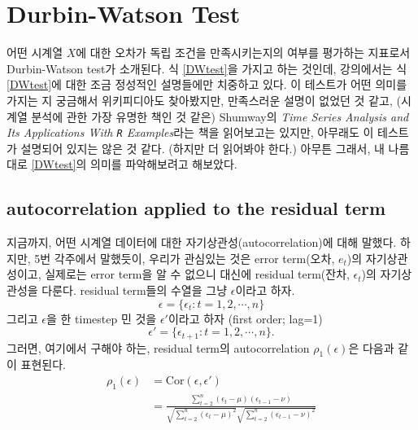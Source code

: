 \documentclass{article}
\begin{document}
\section{Durbin-Watson Test}

어떤 시계열 \(X\)에 대한 오차가 독립 조건을 만족시키는지의 여부를 평가하는 지표로서 Durbin-Watson test가 소개된다.
식 \eqref{DWtest}을 가지고 하는 것인데, 강의에서는 식 \eqref{DWtest}에 대한 조금 정성적인 설명들에만 치중하고 있다.
이 테스트가 어떤 의미를 가지는 지 궁금해서 위키피디아도 찾아봤지만, 만족스러운 설명이 없었던 것 같고, (시계열 분석에 관한 가장 유명한 책인 것 같은) Shumway의 \emph{Time Series Analysis and Its Applications With \texttt R Examples}라는 책을 읽어보고는 있지만, 아무래도 이 테스트가 설명되어 있지는 않은 것 같다.
(하지만 더 읽어봐야 한다.)
아무튼 그래서, 내 나름대로 \eqref{DWtest}의 의미를 파악해보려고 해보았다.

\subsection{autocorrelation applied to the residual term}
지금까지, 어떤 시계열 데이터에 대한 자기상관성(autocorrelation)에 대해 말했다.
하지만, 5번 각주에서 말했듯이, 우리가 관심있는 것은 error term(오차, \(e_t\))의 자기상관성이고, 실제로는 error term을 알 수 없으니 대신에 residual term(잔차, \(\epsilon_t\))의 자기상관성을 다룬다.
residual term들의 수열을 그냥 \(\epsilon\)이라고 하자.
\[\epsilon=\{\epsilon_t:t=1,2,\cdots,n\}\]
그리고 \(\epsilon\)을 한 timestep 민 것을 \(\epsilon'\)이라고 하자 (first order; lag=1)
\[\epsilon'=\{\epsilon_{t+1}:t=1,2,\cdots,n\}.\]
그러면, 여기에서 구해야 하는, residual term의 autocorrelation \(\rho_1(\epsilon)\)은  다음과 같이 표현된다.
\begin{equation}\label{autocorrelation_of_residual}
\begin{aligned}
\rho_1(\epsilon)
&=\text{Cor}(\epsilon,\epsilon')\\
&=\frac{\sum_{t=2}^n(\epsilon_t-\mu)(\epsilon_{t-1}-\nu)}{\sqrt{\sum_{t=2}^n(\epsilon_t-\mu)^2}\sqrt{\sum_{t=2}^n(\epsilon_{t-1}-\nu)^2}}
\end{aligned}
\end{equation}

\end{document}
